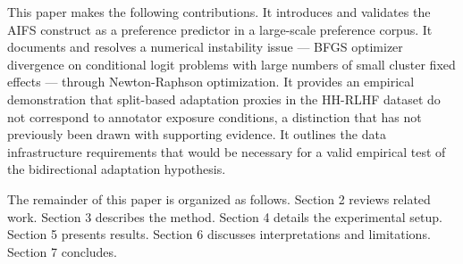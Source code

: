 This paper makes the following contributions. It introduces and validates the AIFS construct as a preference predictor in a large-scale preference corpus. It documents and resolves a numerical instability issue — BFGS optimizer divergence on conditional logit problems with large numbers of small cluster fixed effects — through Newton-Raphson optimization. It provides an empirical demonstration that split-based adaptation proxies in the HH-RLHF dataset do not correspond to annotator exposure conditions, a distinction that has not previously been drawn with supporting evidence. It outlines the data infrastructure requirements that would be necessary for a valid empirical test of the bidirectional adaptation hypothesis.

The remainder of this paper is organized as follows. Section 2 reviews related work. Section 3 describes the method. Section 4 details the experimental setup. Section 5 presents results. Section 6 discusses interpretations and limitations. Section 7 concludes.

